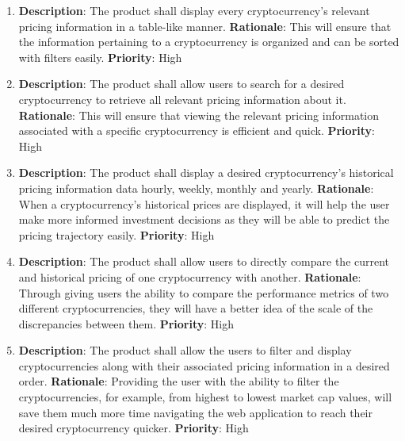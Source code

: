 \documentclass[12pt, titlepage]{article}
\begin{document}
\begin{enumerate}[label = FR-\arabic*, left=\parindent, series=fr]
    \item \textbf{Description}: The product shall display every cryptocurrency's relevant pricing information in a table-like manner.
    \newline \textbf{Rationale}: This will ensure that the information pertaining to a cryptocurrency is organized and can be sorted with filters easily.
    \newline \textbf{Priority}: High

    \item \textbf{Description}: The product shall allow users to search for a desired cryptocurrency to retrieve all relevant pricing information about it.
    \newline \textbf{Rationale}: This will ensure that viewing the relevant pricing information associated with a specific cryptocurrency is efficient and quick.
    \newline \textbf{Priority}: High

    \item \textbf{Description}: The product shall display a desired cryptocurrency's historical pricing information data hourly, weekly, monthly and yearly.
    \newline \textbf{Rationale}: When a cryptocurrency's historical prices are displayed, it will help the user make more informed investment decisions
    as they will be able to predict the pricing trajectory easily.
    \newline \textbf{Priority}: High

    \item \textbf{Description}: The product shall allow users to directly compare the current and historical pricing of one cryptocurrency with another.
    \newline \textbf{Rationale}: Through giving users the ability to compare the performance metrics of two different cryptocurrencies, they will have
    a better idea of the scale of the discrepancies between them. 
    \newline \textbf{Priority}: High

    \item \textbf{Description}: The product shall allow the users to filter and display cryptocurrencies along with their associated pricing information in a desired order. 
    \newline \textbf{Rationale}: Providing the user with the ability to filter the cryptocurrencies, for example, from highest to lowest market cap values, will save them much
    more time navigating the web application to reach their desired cryptocurrency quicker. 
    \newline \textbf{Priority}: High


\end{enumerate}
\end{document}
